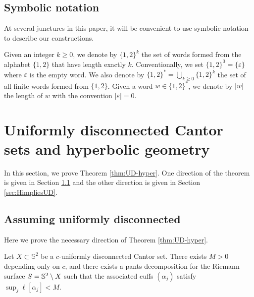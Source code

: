 \documentclass{amsart}
\begin{document}

\subsection{Symbolic notation}
\label{sect:sn}

At several junctures in this paper, it will be convenient to use symbolic notation to describe our constructions.

Given an integer $k\geq 0$, we denote by $\{1,2\}^k$ the set of words formed from the alphabet $\{1,2\}$ that have length exactly $k$. Conventionally, we set $\{1,2\}^0 = \{\varepsilon\}$ where $\varepsilon$ is the empty word. We also denote by $\{1,2\}^* = \bigcup_{k\geq 0}\{1,2\}^k$ the set of all finite words formed from $\{1,2\}$. Given a word $w \in \{1,2\}^*$, we denote by $|w|$ the length of $w$ with the convention $|\varepsilon| = 0$.


\section{Uniformly disconnected Cantor sets and hyperbolic geometry}\label{sec:UD-hyper}

In this section, we prove Theorem \ref{thm:UD-hyper}. One direction of the theorem is given in Section \ref{sec:UDimpliesH} and the other direction is given in Section \ref{sec:HimpliesUD}.


\subsection{Assuming uniformly disconnected}\label{sec:UDimpliesH}

Here we prove the necessary direction of Theorem \ref{thm:UD-hyper}.

\begin{proposition}
\label{thm:1}
Let $X\subset \mathbb{S}^2$ be a $c$-uniformly disconnected Cantor set. There exists $M>0$ depending only on $c$, and there exists a pants decomposition for the Riemann surface $S = \S^2 \setminus X$ such that the associated cuffs $(\alpha_j)$ satisfy $\sup_j \ell [ \alpha_j ] < M$.
\end{proposition}
\end{document}
